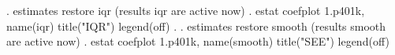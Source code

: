 . estimates restore iqr
(results iqr are active now)
{\smallskip}
. estat coefplot 1.p401k, name(iqr) title("IQR") legend(off)
{\smallskip}
. 
. estimates restore smooth
(results smooth are active now)
{\smallskip}
. estat coefplot 1.p401k, name(smooth) title("SEE") legend(off)
